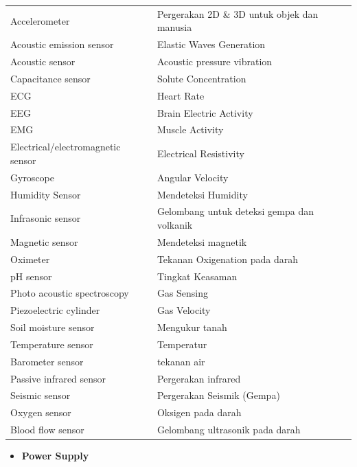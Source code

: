 \documentclass[a4paper,twoside]{article}
\begin{document}
\begin{enumerate}
\begin{itemize}
\begin{table} [H]
\begin{tabular}{|p{5.5cm}|p{7cm}|}
		\midrule
		Accelerometer & Pergerakan 2D \& 3D untuk objek dan manusia  \\
		Acoustic emission sensor & Elastic Waves Generation\\
		Acoustic sensor   & Acoustic pressure vibration\\
		Capacitance sensor  & Solute Concentration\\
		ECG   & Heart Rate\\
		EEG  & Brain Electric Activity\\
		EMG   & Muscle Activity\\
		Electrical/electromagnetic sensor & Electrical Resistivity\\
		Gyroscope  & Angular Velocity \\
		Humidity Sensor   & Mendeteksi Humidity\\
		Infrasonic sensor  &  Gelombang untuk deteksi gempa dan volkanik\\
		Magnetic sensor   & Mendeteksi magnetik\\
		Oximeter   & Tekanan Oxigenation pada darah  \\
		pH sensor  & Tingkat Keasaman\\
		Photo acoustic spectroscopy   & Gas Sensing\\
		Piezoelectric cylinder    &  Gas Velocity\\
		Soil moisture sensor   &  Mengukur tanah\\
		Temperature sensor   & Temperatur \\
		Barometer sensor  &  tekanan air\\
		Passive infrared sensor  & Pergerakan infrared\\
		Seismic sensor   & Pergerakan Seismik (Gempa) \\
		Oxygen sensor  & Oksigen pada darah \\
		Blood flow sensor  & Gelombang ultrasonik pada darah \\

		\bottomrule
		
	\end{tabular} 
\end{table}
\end{itemize}

\begin{itemize}
\item \textbf{Power Supply}


\end{itemize}
\end{enumerate}
\end{document}
